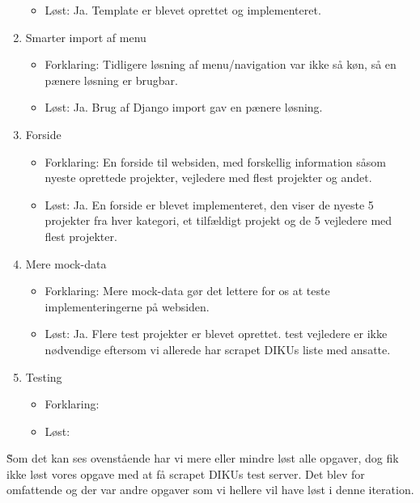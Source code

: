\documentclass[11pt]{article}
\begin{document}
\begin{enumerate}
\begin{itemize}
        \item Løst: Ja. Template er blevet oprettet og implementeret.
	\end{itemize}
\item Smarter import af menu
	\begin{itemize}
	\item Forklaring: Tidligere løsning af menu/navigation var ikke så køn, så en pænere løsning er brugbar.
        \item Løst: Ja. Brug af Django import gav en pænere løsning.
	\end{itemize}
\item Forside
	\begin{itemize}
	\item Forklaring: En forside til websiden, med forskellig information såsom nyeste oprettede projekter, vejledere med flest projekter og andet.
        \item Løst: Ja. En forside er blevet implementeret, den viser de nyeste 5 projekter fra hver kategori, et tilfældigt projekt og de 5 vejledere med flest projekter.
	\end{itemize}
\item Mere mock-data
	\begin{itemize}
	\item Forklaring: Mere mock-data gør det lettere for os at teste implementeringerne på websiden.
        \item Løst: Ja. Flere test projekter er blevet oprettet. test vejledere er ikke nødvendige eftersom vi allerede har scrapet DIKUs liste med ansatte.
	\end{itemize}
\item Testing
	\begin{itemize}
	\item Forklaring: 
        \item Løst:
	\end{itemize}
\end{enumerate}
\~
Som det kan ses ovenstående har vi mere eller mindre løst alle opgaver, dog fik ikke løst vores opgave med at få scrapet DIKUs test server. Det blev for omfattende og der var andre opgaver som vi hellere vil have løst i denne iteration.
\end{document}
